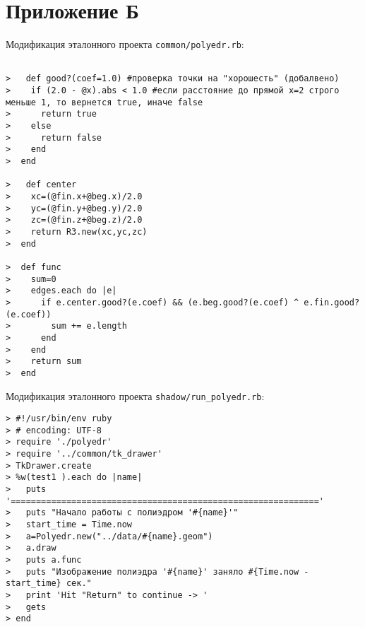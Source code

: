 \section{Приложение Б}

Модификация эталонного проекта \texttt{common/polyedr.rb}:
\begin{small}
\begin{verbatim}
 
>   def good?(coef=1.0) #проверка точки на "хорошесть" (добалвено)
>    if (2.0 - @x).abs < 1.0 #если расстояние до прямой x=2 строго меньше 1, то вернется true, иначе false
>      return true
>    else
>      return false
>    end 
>  end

>   def center
>    xc=(@fin.x+@beg.x)/2.0 
>    yc=(@fin.y+@beg.y)/2.0
>    zc=(@fin.z+@beg.z)/2.0
>    return R3.new(xc,yc,zc)
>  end

>  def func 
>    sum=0
>    edges.each do |e|
>      if e.center.good?(e.coef) && (e.beg.good?(e.coef) ^ e.fin.good?(e.coef))
>        sum += e.length
>      end
>    end
>    return sum
>  end
\end{verbatim}
\end{small}

\newpage
Модификация эталонного проекта \texttt{shadow/run\_polyedr.rb}:

\begin{small}
\begin{verbatim}
> #!/usr/bin/env ruby
> # encoding: UTF-8
> require './polyedr'
> require '../common/tk_drawer'
> TkDrawer.create
> %w(test1 ).each do |name|
>   puts '============================================================='
>   puts "Начало работы с полиэдром '#{name}'"
>   start_time = Time.now
>   a=Polyedr.new("../data/#{name}.geom")
>   a.draw
>   puts a.func
>   puts "Изображение полиэдра '#{name}' заняло #{Time.now - start_time} сек."
>   print 'Hit "Return" to continue -> '
>   gets
> end
\end{verbatim}
\end{small}

